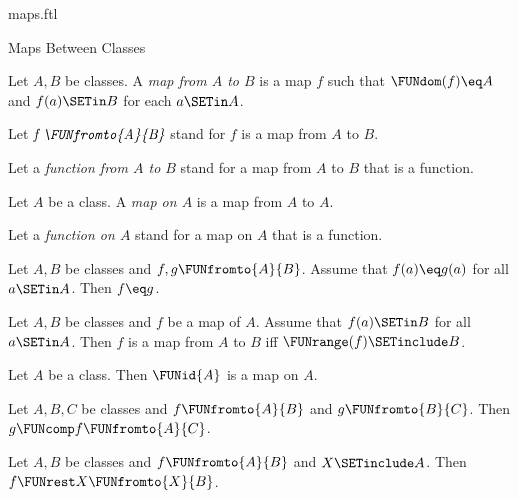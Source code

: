 \documentclass{naproche-library}
\begin{document}
\begin{smodule}[title=Maps]{maps.ftl}
\begin{sfragment}{Maps Between Classes}
  \begin{definition}[forthel,id=FOUNDATIONS_06_2823507398361088]
    Let $A, B$ be classes.
    A \emph{map from $A$ to $B$} is a map $f$ such that $\FUNdom(f) \eq A$ and $f(a) \SETin B$ for each $a \SETin A$.

    Let $\emph{f \FUNfromto{A}{B}}$ stand for $f$ is a map from $A$ to $B$.

    Let a \emph{function from $A$ to $B$} stand for a map from $A$ to $B$ that is a function.
  \end{definition}

  \begin{definition}[forthel,id=FOUNDATIONS_06_3390734908522496]
    Let $A$ be a class.
    A \emph{map on $A$} is a map from $A$ to $A$.

    Let a \emph{function on $A$} stand for a map on $A$ that is a function.
  \end{definition}

  \begin{proposition}[forthel,id=FOUNDATIONS_06_3312973569327104]
    Let $A, B$ be classes and $f, g \FUNfromto{A}{B}$.
    Assume that $f(a) \eq g(a)$ for all $a \SETin A$.
    Then $f \eq g$.
  \end{proposition}

  \begin{proposition}[forthel,id=FOUNDATIONS_06_7023948574102873]
    Let $A, B$ be classes and $f$ be a map of $A$.
    Assume that $f(a) \SETin B$ for all $a \SETin A$.
    Then $f$ is a map from $A$ to $B$ iff $\FUNrange(f) \SETinclude B$.
  \end{proposition}

  \begin{proposition}[forthel,id=FOUNDATIONS_06_5104361690628096]
    Let $A$ be a class.
    Then $\FUNid{A}$ is a map on $A$.
  \end{proposition}

  \begin{proposition}[forthel,id=FOUNDATIONS_06_1706446651654144]
    Let $A, B, C$ be classes and $f \FUNfromto{A}{B}$ and $g \FUNfromto{B}{C}$.
    Then $g \FUNcomp f \FUNfromto{A}{C}$.
  \end{proposition}

  \begin{proposition}[forthel,id=FOUNDATIONS_06_4078561256275968]
    Let $A, B$ be classes and $f \FUNfromto{A}{B}$ and $X \SETinclude A$.
    Then $f \FUNrest X \FUNfromto{X}{B}$.
  \end{proposition}


\end{sfragment}
\end{smodule}
\end{document}
